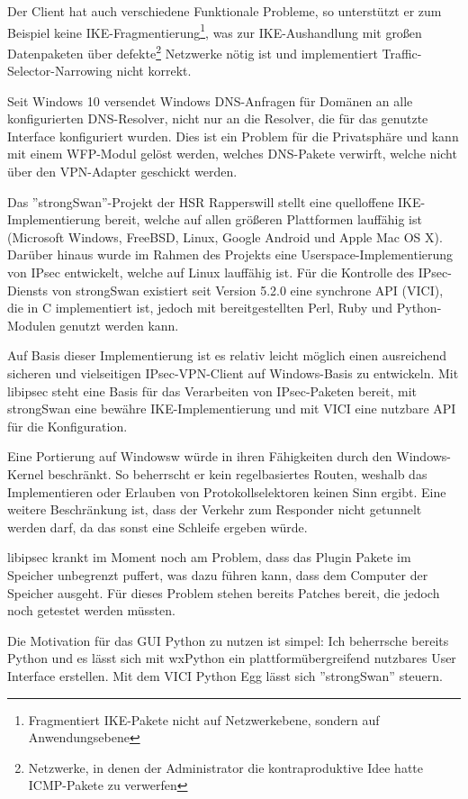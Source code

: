 \documentclass[a4paper]{article}
\begin{document}
Der Client hat auch verschiedene Funktionale Probleme, so unterstützt er zum Beispiel
keine IKE-Fragmentierung\footnote{Fragmentiert IKE-Pakete nicht auf Netzwerkebene, sondern auf Anwendungsebene},
was zur IKE-Aushandlung mit großen Datenpaketen über defekte\footnote{Netzwerke, in denen der Administrator die kontraproduktive Idee hatte ICMP-Pakete zu verwerfen}
Netzwerke nötig ist und implementiert Traffic-Selector-Narrowing nicht korrekt.

Seit Windows 10 versendet Windows DNS-Anfragen für Domänen an alle konfigurierten
DNS-Resolver, nicht nur an die Resolver, die für das genutzte Interface konfiguriert wurden.
Dies ist ein Problem für die Privatsphäre und kann mit einem \ac{WFP}-Modul
gelöst werden, welches DNS-Pakete verwirft, welche nicht über den VPN-Adapter
geschickt werden.


Das ''strongSwan''-Projekt der HSR Rapperswill stellt eine quelloffene
IKE-Implementierung bereit, welche auf allen größeren Plattformen lauffähig ist
(Microsoft Windows, FreeBSD, Linux, Google Android und Apple Mac OS X). 
Darüber hinaus wurde im Rahmen des Projekts eine Userspace-Implementierung von IPsec entwickelt,
welche auf Linux lauffähig ist. Für die Kontrolle des IPsec-Diensts von strongSwan
existiert seit Version 5.2.0 eine synchrone \ac{API} (\ac{VICI}), die in C implementiert ist,
jedoch mit bereitgestellten Perl, Ruby und Python-Modulen genutzt werden kann.

Auf Basis dieser Implementierung ist es relativ leicht möglich einen ausreichend
sicheren und vielseitigen IPsec-VPN-Client auf Windows-Basis zu entwickeln.
Mit libipsec steht eine Basis für das Verarbeiten von IPsec-Paketen bereit, mit strongSwan eine
bewähre IKE-Implementierung und mit \ac{VICI} eine nutzbare \ac{API} für die Konfiguration.

Eine Portierung auf Windowsw würde in ihren Fähigkeiten durch den Windows-Kernel
beschränkt. So beherrscht er kein regelbasiertes Routen, weshalb das Implementieren
oder Erlauben von Protokollselektoren keinen Sinn ergibt. Eine weitere
Beschränkung ist, dass der Verkehr zum Responder nicht getunnelt werden darf, da
das sonst eine Schleife ergeben würde.

libipsec krankt im Moment noch am Problem, dass das Plugin Pakete im Speicher unbegrenzt
puffert, was dazu führen kann, dass dem Computer der Speicher ausgeht. Für dieses
Problem stehen bereits Patches bereit, die jedoch noch getestet werden müssten.

Die Motivation für das \ac{GUI} Python zu nutzen ist simpel: Ich beherrsche bereits
Python und es lässt sich mit wxPython ein plattformübergreifend nutzbares User Interface erstellen.
Mit dem \ac{VICI} Python Egg lässt sich ''strongSwan'' steuern.
\end{document}
